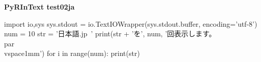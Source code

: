\documentclass[pdflatex, jadriver=standard]{bxjsarticle}
\begin{document}
{\Large\bf PyRInText test02ja}

\begin{pycode}
import io,sys 
sys.stdout = io.TextIOWrapper(sys.stdout.buffer, encoding='utf-8')
num = 10
str = '日本語.jp~'
print(str + 'を', num, '回表示します。\\par \\vspace{1mm}')
for i in range(num):
	print(str)
\end{pycode}
\end{document}
